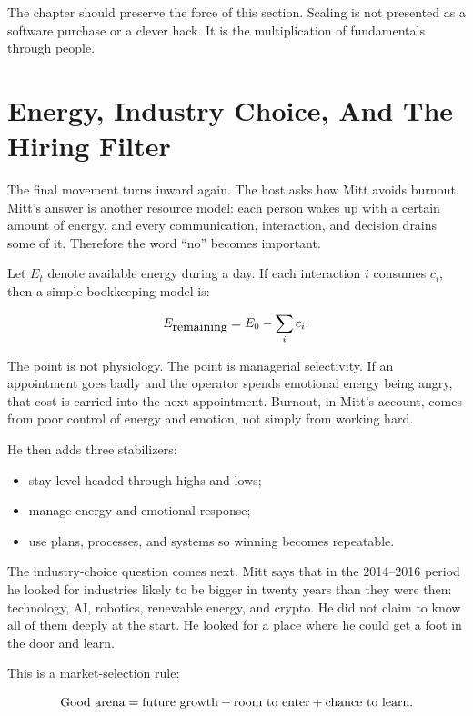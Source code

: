 The chapter should preserve the force of this section. Scaling is not presented as a software purchase or a clever hack. It is the multiplication of fundamentals through people.

\section{Energy, Industry Choice, And The Hiring Filter}

The final movement turns inward again. The host asks how Mitt avoids burnout. Mitt's answer is another resource model: each person wakes up with a certain amount of energy, and every communication, interaction, and decision drains some of it. Therefore the word ``no'' becomes important.

Let \(E_t\) denote available energy during a day. If each interaction \(i\) consumes \(c_i\), then a simple bookkeeping model is:

\begin{equation}
  E_{\hbox{remaining}}
  =
  E_0 - \sum_i c_i.
\end{equation}

The point is not physiology. The point is managerial selectivity. If an appointment goes badly and the operator spends emotional energy being angry, that cost is carried into the next appointment. Burnout, in Mitt's account, comes from poor control of energy and emotion, not simply from working hard.

He then adds three stabilizers:

\begin{itemize}
  \item stay level-headed through highs and lows;
  \item manage energy and emotional response;
  \item use plans, processes, and systems so winning becomes repeatable.
\end{itemize}

The industry-choice question comes next. Mitt says that in the 2014--2016 period he looked for industries likely to be bigger in twenty years than they were then: technology, AI, robotics, renewable energy, and crypto. He did not claim to know all of them deeply at the start. He looked for a place where he could get a foot in the door and learn.

This is a market-selection rule:

\begin{equation}
  \hbox{Good arena}
  =
  \hbox{future growth}
  +
  \hbox{room to enter}
  +
  \hbox{chance to learn}.
\end{equation}

